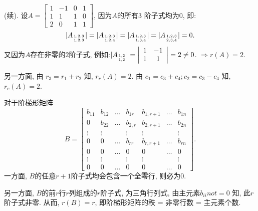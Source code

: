 \begin{eg}(续). 设$A=\begin{bmatrix}1&-1&0&1\\1&1&1&0\\2&0&1&1\end{bmatrix}$, 因为$A$的所有$3$ 阶子式均为$0$, 即:
\begin{displaymath}
|A_{1,2,3\atop 1,2,3}|=|A_{1,2,3\atop 1,2,4}|=|A_{1,2,3\atop 1,3,4}|=|A_{1,2,3\atop 2,3,4}|=0.\end{displaymath}
又因为$A$存在非零的$2$阶子式, 例如:$|A_{1,2\atop 1,2}|=\left|\begin{array}{cc}1&-1\\1&1\end{array}\right|=2\not=0$. $\Rightarrow r(A)=2$.

另一方面, 由 $r_3 = r_1+r_2$ 知, $r_r(A) = 2$. 由 $c_1 = c_3+c_4; c_2 = c_3-c_4$ 知, $r_c(A) = 2$.
\end{eg}

\begin{eg}
对于阶梯形矩阵
$$B=\begin{bmatrix}b_{11}&b_{12}&\dots &b_{1r}&b_{1,r+1}&\dots&b_{1n}\\ 0& b_{22}&\dots &b_{2,r}&b_{2,r+1}&\dots &b_{2n}\\ \vdots&\vdots&&\vdots&\vdots&&\vdots\\ 0&0&\dots&b_{rr}&b_{r,r+1}&\dots&b_{rn}\\ 0&0&\dots&0&0&\dots&0\\\vdots&\vdots&&\vdots&\vdots&&\vdots\\0&0&\dots&0&0&\dots&0
\end{bmatrix}.$$
一方面, $B$的任意$r+1$阶子式均会包含一个全零行, 则必为$0$.

另一方面, $B$的前$r$行$r$列组成的$r$阶子式, 为三角行列式, 由主元素$b_{ii}
not= 0$ 知, 此$r$ 阶子式非零.
 从而, $r(B) = r$, 即阶梯形矩阵的秩 = 非零行数 = 主元素个数.
\end{eg}

